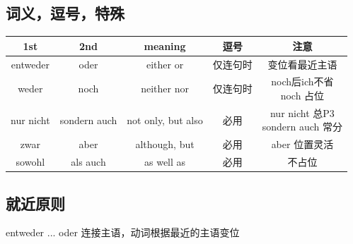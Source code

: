 \subsection{词义，逗号，特殊}
\begin{center}
    \begin{tabular}{|c|c|c|c|c|}
        \hline
        \rowcolor{gray}
        1st       & 2nd          & meaning            & 逗号   & 注意                      \\
        \hline
        entweder  & oder         & either or          & 仅连句时 & 变位看最近主语                 \\
        \hline
        weder     & noch         & neither nor        & 仅连句时 & \makecell{noch后ich不省    \\ noch 占位} \\
        \hline
        nur nicht & sondern auch & not only, but also & 必用   & \makecell{nur nicht 总P3 \\ sondern auch 常分} \\
        \hline
        zwar      & aber         & although, but      & 必用   & aber 位置灵活               \\
        \hline
        sowohl    & als auch     & as well as         & 必用   & 不占位                     \\
        \hline
    \end{tabular}
\end{center}

\subsection{就近原则}
entweder ... oder 连接主语，动词根据最近的主语变位

